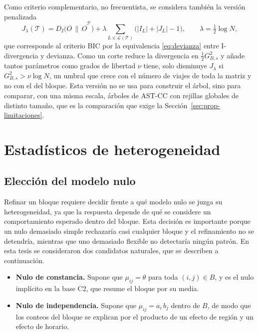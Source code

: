 Como criterio complementario, no frecuentista, se considera también la versión
penalizada
\begin{equation}\label{eq:prop-bic}
  J_\lambda(\mathcal{T}) = D_I\bigl(O\,\|\,\hat O^{\mathcal{T}}\bigr)
  + \lambda \sum_{L\in\mathcal{L}(\mathcal{T})}\bigl(|I_L|+|J_L|-1\bigr),
  \qquad \lambda = \tfrac12\log N,
\end{equation}
que corresponde al criterio \ac{BIC} \citep{Schwarz1978} por la equivalencia
\eqref{eq:devianza} entre I-divergencia y devianza. Como un corte reduce la
divergencia en $\tfrac12 G^2_{B,s}$ y añade tantos parámetros como grados de
libertad $\nu$ tiene, solo disminuye $J_\lambda$ si $G^2_{B,s} > \nu\log N$, un
umbral que crece con el número de viajes de toda la matriz y no con el del
bloque. Esta versión no se usa para construir el árbol, sino para comparar, con
una misma escala, árboles de AST-CC con rejillas globales de distinto tamaño,
que es la comparación que exige la Sección~\ref{sec:prop-limitaciones}.

\section{Estadísticos de heterogeneidad}\label{sec:prop-estadisticos}

\subsection{Elección del modelo nulo}

Refinar un bloque requiere decidir frente a qué modelo nulo se juzga su
heterogeneidad, ya que la respuesta depende de qué se considere un comportamiento
esperado dentro del bloque. Esta decisión es importante porque un nulo
demasiado simple rechazaría casi cualquier bloque y el refinamiento no se
detendría, mientras que uno demasiado flexible no detectaría ningún patrón. En
esta tesis se consideraron dos candidatos naturales, que se describen a
continuación.

\begin{itemize}
  \item \textbf{Nulo de constancia.} Supone que $\mu_{ij}=\theta$ para toda
  $(i,j)\in B$, y es el nulo implícito en la base C2, que resume el bloque por
  su media.
  \item \textbf{Nulo de independencia.} Supone que $\mu_{ij} = a_i\, b_j$ dentro de
  $B$, de modo que los conteos del bloque se explican por el producto de un efecto
  de región y un efecto de horario.
\end{itemize}

